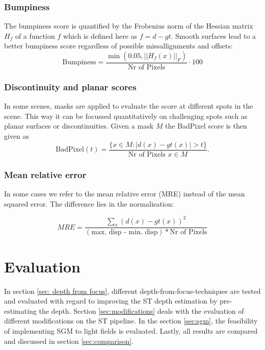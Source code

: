 \documentclass  [
  paper    = a4,
  BCOR     = 10mm,
  twoside,
  fontsize = 12pt,
  fleqn,
  toc      = bibnumbered,
  toc      = listofnumbered,
  numbers  = noendperiod,
  headings = normal,
  listof   = leveldown,
  version  = 3.03
]                                       {scrreprt}
\begin{document}
\subsection{Bumpiness}
The bumpiness score is quantified by the Frobenius norm of the Hessian matrix $H_f$ of a function $f$ which is defined here as $f = d-gt$. Smooth surfaces lead to a better bumpiness score regardless of possible missallignments and offsets:
\begin{equation}\label{key}
\text{Bumpiness} = \frac{\min(0.05, ||H_f(x)||_F)}{\text{Nr of Pixels}} \cdot 100
\end{equation}
\subsection{Discontinuity and planar scores}
In some scenes, masks are applied to evaluate the score at different spots in the scene. This way it can be focussed quantitatively on challenging spots such as planar surfaces or discontinuities. Given a mask $M$ the BadPixel score is then given as 
\begin{equation}\label{key}
\text{BadPixel}(t) = \frac{\{x \in M:|d(x) - gt(x)| > t \}}{\text{Nr of Pixels }x \in M}.
\end{equation}
\subsection{Mean relative error}
In some cases we refer to the mean relative error (MRE) instead of the mean squared error. The difference lies in the normalisation:

\begin{equation}\label{key}
MRE = \frac{\sum_{x} (d(x) - gt(x) )^2}{(\text{max. disp - min. disp})* \text{Nr of Pixels}}
\end{equation}



\chapter{Evaluation}
\label{Evaluation}
In section \ref{sec: depth from focus}, different depth-from-focus-techniques are tested and evaluated with regard to improving the ST depth estimation by pre-estimating the depth. Section \ref{sec:modifications} deals with the evaluation of different modifications on the ST pipeline. In the section \ref{sec:sgm}, the feasibility of implementing SGM to light fields is evaluated. Lastly, all results are compared and discussed in section \ref{sec:comparison}.
\end{document}

